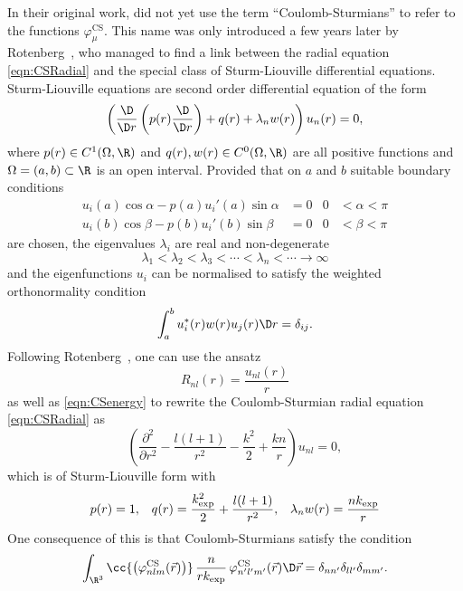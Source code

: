 In their original work, \citet{Shull1959} did not yet use the term ``Coulomb-Sturmians''
to refer to the functions $\varphi^\text{CS}_\mu$.
This name was only introduced a few years later
by Rotenberg~\cite{Rotenberg1962,Rotenberg1970},
who managed to find a link between the \CS radial equation \eqref{eqn:CSRadial}
and the special class of Sturm-Liouville differential equations.
Sturm-Liouville equations are second order differential equation of the form
\begin{equation}
	\left(
	\frac{\D}{\D r} \left( p(r) \frac{\D}{\D r} \right) + q(r) + \lambda_n w(r) \right) u_n(r) = 0,
	\label{eqn:SturmLiouville}
\end{equation}
where $p(r) \in C^1(\Omega, \R)$ and $q(r), w(r) \in C^0(\Omega, \R)$ are all positive
functions and $\Omega = (a,b) \subset \R$ is an open interval.
Provided that on $a$ and $b$ suitable boundary conditions
\begin{align*}
	u_i(a) \cos \alpha - p(a) u_i'(a) \sin \alpha &= 0 & 0 &< \alpha < \pi \\
	u_i(b) \cos \beta - p(b) u_i'(b) \sin \beta &= 0 & 0 &< \beta < \pi
\end{align*}
are chosen,
the eigenvalues $\lambda_i$ are real and non-degenerate
\[ \lambda_1 < \lambda_2 < \lambda_3 < \cdots < \lambda_n < \cdots \to \infty \]
and the eigenfunctions $u_i$ can be normalised
to satisfy the weighted orthonormality condition
\begin{equation}
	\int_a^b u_i^\ast(r) w(r) u_j(r) \D r = \delta_{ij}.
	\label{eqn:SturmLiouvilleWeightedOrtho}
\end{equation}
Following Rotenberg~\cite{Rotenberg1962,Rotenberg1970}, one can use the ansatz
\[ R_{nl}(r) = \frac{u_{nl}(r)}{r} \]
as well as \eqref{eqn:CSenergy} to rewrite the Coulomb-Sturmian radial equation
\eqref{eqn:CSRadial} as
\[ \left(\frac{\partial^2}{\partial r^2} - \frac{l (l+1)}{r^2} - \frac{k^2}{2} + \frac{kn}{r} \right)
u_{nl} = 0, \]
which is of Sturm-Liouville form with
\begin{align*}
	p(r) &= 1, &
	q(r) &= \frac{k_\text{exp}^2}{2} + \frac{l (l+1)}{r^2}, &
	\lambda_n w(r) = \frac{nk_\text{exp}}{r}
\end{align*}
One consequence of this is that Coulomb-Sturmians satisfy
the  condition~\cite{Avery2006}
\begin{equation}
	\int_{\R^3} \cc{\left(\varphi^{\text{CS}}_{nlm}(\vec{r})\right)}\,
		\frac{n}{r\kexp} \, \varphi^\text{CS}_{n'l'm'}(\vec{r})
		\D \vec{r} = \delta_{n n'} \delta_{l l'} \delta_{m m'}.
	\label{eqn:CoulombSturmianWeightedOrtho}
\end{equation}
